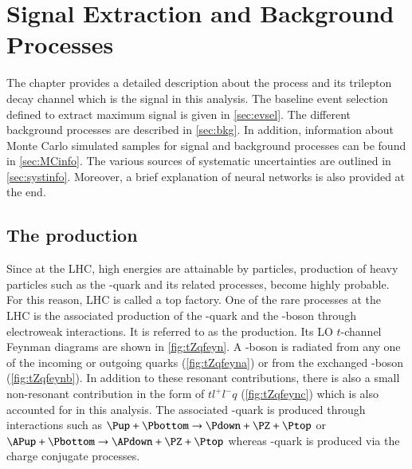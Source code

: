 
\chapter{Signal Extraction and Background Processes}
\label{sec:tZq}
The chapter provides a detailed description about the \tZq process and its trilepton decay channel
which is the signal in this analysis. The baseline event selection defined to extract maximum signal is
given in \cref{sec:evsel}. The different background processes are described in
\cref{sec:bkg}. In addition, information about Monte Carlo simulated samples for signal and 
background processes can be found in \cref{sec:MCinfo}. The various sources of systematic uncertainties
are outlined in \cref{sec:systinfo}. Moreover, a brief explanation of neural networks is also provided 
at the end. 
\section{The \tZqsec production}
\label{sec:tZqdescribe}
Since at the LHC, high energies are attainable by particles, production of heavy particles such as the
\Ptop-quark and its related processes, become highly probable. For this reason, LHC is called a top 
factory. One of the
rare processes at the LHC is the associated production of the \Ptop-quark and the 
\PZ-boson through electroweak interactions. It is referred to as the \tZq production. Its LO $t$-channel
Feynman diagrams are shown in \cref{fig:tZqfeyn}. A \PZ-boson is radiated from any one of the incoming or outgoing 
quarks (\cref{fig:tZqfeyna}) or from the exchanged \PW-boson (\cref{fig:tZqfeynb}). In addition to these
resonant contributions, there is also a small non-resonant contribution 
in the form of $tl^+l^-q$ (\cref{fig:tZqfeync}) which is also accounted for in this analysis. 
The associated \Ptop-quark is produced through interactions such as $\Pup+\Pbottom \rightarrow \Pdown+\PZ+\Ptop$ or 
$\APup+\Pbottom \rightarrow \APdown+\PZ+\Ptop$ whereas \APtop-quark is produced 
via the charge conjugate processes. 



